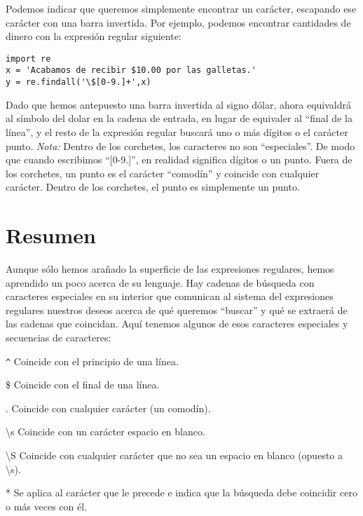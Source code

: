 Podemos indicar que queremos simplemente encontrar un carácter, escapando ese carácter con
una barra invertida. Por ejemplo, podemos encontrar cantidades de dinero con la expresión regular
siguiente:

\beforeverb
\begin{verbatim}
import re
x = 'Acabamos de recibir $10.00 por las galletas.'
y = re.findall('\$[0-9.]+',x)
\end{verbatim}
\afterverb
%
Dado que hemos antepuesto una barra invertida al signo dólar, ahora equivaldrá al símbolo del dolar
en la cadena de entrada, en lugar de equivaler al ``final de la línea'', y el resto de la expresión
regular buscará uno o más dígitos o el carácter punto. {\em Nota:} Dentro de los corchetes,
los caracteres no son ``especiales''. De modo que cuando escribimos ``[0-9.]'', en realidad
significa dígitos o un punto. Fuera de los corchetes, un punto es el carácter ``comodín'' y
coincide con cualquier carácter. Dentro de los corchetes, el punto es simplemente un punto.

\section{Resumen}

Aunque sólo hemos arañado la superficie de las expresiones regulares, hemos aprendido un poco
acerca de su lenguaje. Hay cadenas de búsqueda con caracteres especiales en su interior que
comunican al sistema del expresiones regulares nuestros deseos acerca de qué queremos ``buscar''
y qué se extraerá de las cadenas que coincidan. Aquí tenemos algunos de esos caracteres especiales
y secuencias de caracteres:

\verb"^" \newline
Coincide con el principio de una línea.

\$ \newline
Coincide con el final de una línea.

. \newline
Coincide con cualquier carácter (un comodín).

{\textbackslash}s \newline
Coincide con un carácter espacio en blanco.

{\textbackslash}S \newline
Coincide con cualquier carácter que no sea un espacio en blanco (opuesto a {\textbackslash}s).

* \newline
Se aplica al carácter que le precede e indica que la búsqueda debe coincidir cero o más veces con él.

